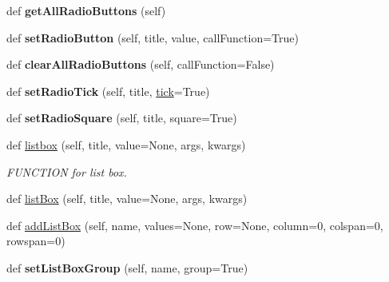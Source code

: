 \begin{DoxyCompactItemize}
def {\bfseries get\+All\+Radio\+Buttons} (self)
\item 
\mbox{\label{class_python_01_g_u_i_1_1appjar_1_1gui_af69209dba535abdc4b9e2f3e5e9946e9}} 
def {\bfseries set\+Radio\+Button} (self, title, value, call\+Function=True)
\item 
\mbox{\label{class_python_01_g_u_i_1_1appjar_1_1gui_a0d5c1184e72129a7b82525aae9946692}} 
def {\bfseries clear\+All\+Radio\+Buttons} (self, call\+Function=False)
\item 
\mbox{\label{class_python_01_g_u_i_1_1appjar_1_1gui_ab5954fed74b77e602effda5b70547b12}} 
def {\bfseries set\+Radio\+Tick} (self, title, \hyperlink{class_python_01_g_u_i_1_1appjar_1_1gui_a7e3bbb08ee85d2e8d1acc4757f18ede4}{tick}=True)
\item 
\mbox{\label{class_python_01_g_u_i_1_1appjar_1_1gui_ab9f0a63cb14c5ba948cfbb9f85237c36}} 
def {\bfseries set\+Radio\+Square} (self, title, square=True)
\item 
def \hyperlink{class_python_01_g_u_i_1_1appjar_1_1gui_aa0838d82bbc76a9a358846a617924e12}{listbox} (self, title, value=None, args, kwargs)
\begin{DoxyCompactList}\small\item\em F\+U\+N\+C\+T\+I\+ON for list box. \end{DoxyCompactList}\item 
def \hyperlink{class_python_01_g_u_i_1_1appjar_1_1gui_a682bc60268b1ea9ad1e4eb4a2afce292}{list\+Box} (self, title, value=None, args, kwargs)
\item 
def \hyperlink{class_python_01_g_u_i_1_1appjar_1_1gui_ae6f6df9c4e30998bcf26d6849d8d2ded}{add\+List\+Box} (self, name, values=None, row=None, column=0, colspan=0, rowspan=0)
\item 
\mbox{\label{class_python_01_g_u_i_1_1appjar_1_1gui_a8d44b175bc92c70850916b4b5f856813}} 
def {\bfseries set\+List\+Box\+Group} (self, name, group=True)
\item 
\mbox{\label{class_python_01_g_u_i_1_1appjar_1_1gui_ac98ab9aa68196015ee01a8b39999795d}} 

\end{DoxyCompactItemize}
